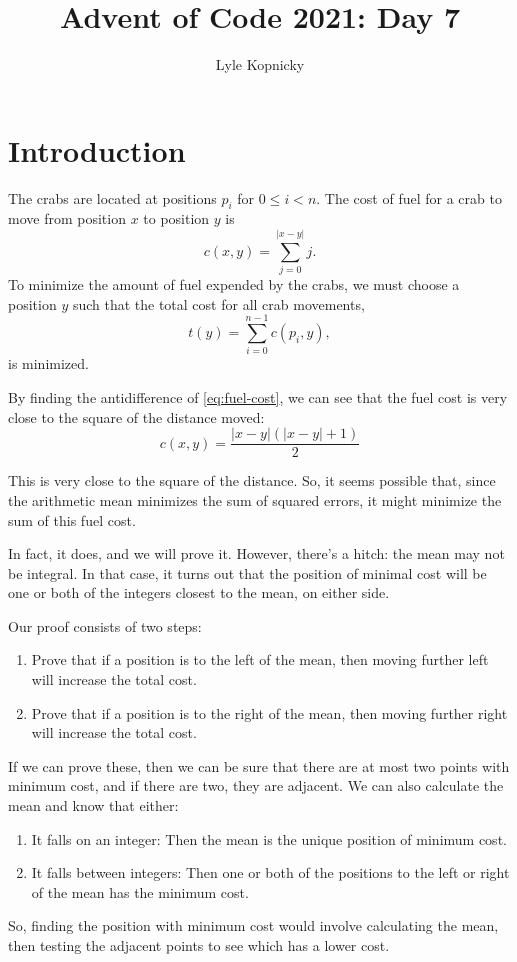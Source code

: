 \documentclass{article}
\begin{document}
\title{Advent of Code 2021: Day 7}
\author{Lyle Kopnicky}
\maketitle
\section{Introduction}
The crabs are located at positions $p_i$ for $0 \le i < n$.
The cost of fuel for a crab to move from position $x$ to position $y$ is
\begin{equation}\label{eq:fuel-cost}
  c(x, y) = \sum_{j=0}^{|x-y|} j.
\end{equation}
To minimize the amount of fuel expended by the crabs, we must choose a position $y$
such that the total cost for all crab movements,
\begin{equation}
  t(y) = \sum_{i=0}^{n-1} c(p_i, y),
\end{equation}
is minimized.

By finding the antidifference of \eqref{eq:fuel-cost}, we can see that the
fuel cost is very close to the square of the distance moved:
\begin{equation}
  c(x, y) = \frac{|x - y|(|x - y| + 1)}{2}
\end{equation}

This is very close to the square of the distance.
So, it seems possible that, since the arithmetic mean minimizes
the sum of squared errors, it might minimize the sum
of this fuel cost.

In fact, it does, and we will prove it. However, there's a hitch:
the mean may not be integral. In that case, it turns out that the
position of minimal cost will be one or both of the integers closest
to the mean, on either side.

Our proof consists of two steps:
\begin{enumerate}
  \item Prove that if a position is to the left of the mean, then
  moving further left will increase the total cost.
  \item Prove that if a position is to the right of the mean, then
  moving further right will increase the total cost.
\end{enumerate}
If we can prove these, then we can be sure that there are at most
two points with minimum cost, and if there are two, they are adjacent.
We can also calculate the mean and know that either:
\begin{enumerate}
  \item It falls on an integer: Then the mean is the unique position
        of minimum cost.
  \item It falls between integers: Then one or both of the positions
        to the left or right of the mean has the minimum cost.
\end{enumerate}
So, finding the position with minimum cost would involve calculating
the mean, then testing the adjacent points to see which has a lower
cost.
\end{document}
